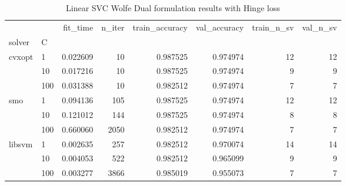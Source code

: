\begin{table}[h!]
\centering
\caption{Linear SVC Wolfe Dual formulation results with Hinge loss}
\label{linear_dual_svc_cv_results}
\begin{tabular}{llrrrrrr}
\toprule
       &     &  fit\_time &  n\_iter &  train\_accuracy &  val\_accuracy &  train\_n\_sv &  val\_n\_sv \\
solver & C &           &         &                 &               &             &           \\
\midrule
cvxopt & 1   &  0.022609 &      10 &        0.987525 &      0.974974 &          12 &        12 \\
       & 10  &  0.017216 &      10 &        0.987525 &      0.974974 &           9 &         9 \\
       & 100 &  0.031388 &      10 &        0.982512 &      0.974974 &           7 &         7 \\
smo & 1   &  0.094136 &     105 &        0.987525 &      0.974974 &          12 &        12 \\
       & 10  &  0.121012 &     144 &        0.987525 &      0.974974 &           8 &         8 \\
       & 100 &  0.660060 &    2050 &        0.982512 &      0.974974 &           7 &         7 \\
libsvm & 1   &  0.002635 &     257 &        0.982512 &      0.970074 &          14 &        14 \\
       & 10  &  0.004053 &     522 &        0.982512 &      0.965099 &           9 &         9 \\
       & 100 &  0.003277 &    3866 &        0.985019 &      0.955073 &           7 &         7 \\
\bottomrule
\end{tabular}
\end{table}
